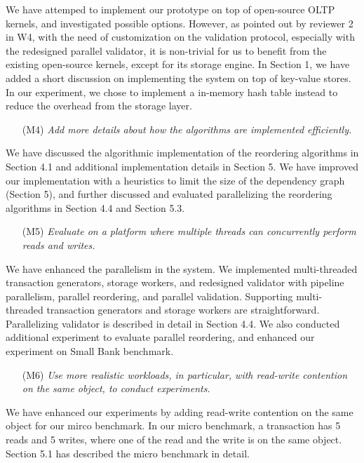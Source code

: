 \documentclass{article}
\begin{document}
We have attemped to implement our prototype on top of open-source OLTP kernels, and investigated possible options. However, as pointed out by reviewer 2 in W4, with the need of customization on the validation protocol, especially with the redesigned parallel validator,  it is non-trivial for us to benefit from the existing open-source kernels, except for its storage engine. In Section 1, we have added a short discussion on implementing the system on top of key-value stores. In our experiment, we chose to implement a in-memory hash table instead to reduce the overhead from the storage layer.

\begin{itemize}
\item[(M4)]  \emph{Add more details about how the algorithms are implemented efficiently.}
\end{itemize}
We have discussed the algorithmic implementation of the reordering algorithms in Section 4.1 and additional implementation details in Section 5. We have improved our implementation with a heuristics to limit the size of the dependency graph (Section 5), and further discussed and evaluated parallelizing the reordering algorithms in Section 4.4 and Section 5.3. 

\begin{itemize}
\item[(M5)]  \emph{Evaluate on a platform where multiple threads can concurrently perform reads and writes.}
\end{itemize}
We have enhanced the parallelism in the system. We implemented multi-threaded transaction generators, storage workers, and redesigned validator with pipeline parallelism, parallel reordering, and parallel validation. Supporting multi-threaded transaction generators and storage workers are straightforward. Parallelizing validator is described in detail in Section 4.4. We also conducted additional experiment to evaluate parallel reordering, and enhanced our experiment on Small Bank benchmark.

\begin{itemize}
\item[(M6)] \emph{Use more realistic workloads, in particular, with read-write contention on the same object, to conduct experiments.}
\end{itemize}

We have enhanced our experiments by adding read-write contention on the same object for our mirco benchmark. In our micro benchmark, a transaction has 5 reads and 5 writes, where one of the read and the write is on the same object. Section 5.1 has described the micro benchmark in detail.
\end{document}

